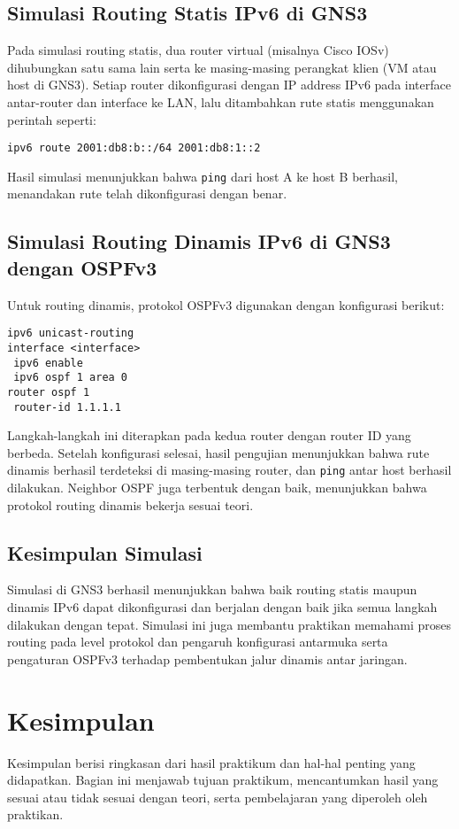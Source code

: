 \subsection{Simulasi Routing Statis IPv6 di GNS3}
Pada simulasi routing statis, dua router virtual (misalnya Cisco IOSv) dihubungkan satu sama lain serta ke masing-masing perangkat klien (VM atau host di GNS3). Setiap router dikonfigurasi dengan IP address IPv6 pada interface antar-router dan interface ke LAN, lalu ditambahkan rute statis menggunakan perintah seperti:
\begin{verbatim}
ipv6 route 2001:db8:b::/64 2001:db8:1::2
\end{verbatim}
Hasil simulasi menunjukkan bahwa \texttt{ping} dari host A ke host B berhasil, menandakan rute telah dikonfigurasi dengan benar.

\subsection{Simulasi Routing Dinamis IPv6 di GNS3 dengan OSPFv3}
Untuk routing dinamis, protokol OSPFv3 digunakan dengan konfigurasi berikut:
\begin{verbatim}
ipv6 unicast-routing
interface <interface>
 ipv6 enable
 ipv6 ospf 1 area 0
router ospf 1
 router-id 1.1.1.1
\end{verbatim}
Langkah-langkah ini diterapkan pada kedua router dengan router ID yang berbeda. Setelah konfigurasi selesai, hasil pengujian menunjukkan bahwa rute dinamis berhasil terdeteksi di masing-masing router, dan \texttt{ping} antar host berhasil dilakukan. Neighbor OSPF juga terbentuk dengan baik, menunjukkan bahwa protokol routing dinamis bekerja sesuai teori.

\subsection{Kesimpulan Simulasi}
Simulasi di GNS3 berhasil menunjukkan bahwa baik routing statis maupun dinamis IPv6 dapat dikonfigurasi dan berjalan dengan baik jika semua langkah dilakukan dengan tepat. Simulasi ini juga membantu praktikan memahami proses routing pada level protokol dan pengaruh konfigurasi antarmuka serta pengaturan OSPFv3 terhadap pembentukan jalur dinamis antar jaringan.

\section{Kesimpulan}
Kesimpulan berisi ringkasan dari hasil praktikum dan hal-hal penting yang didapatkan. Bagian ini menjawab tujuan praktikum, mencantumkan hasil yang sesuai atau tidak sesuai dengan teori, serta pembelajaran yang diperoleh oleh praktikan.

